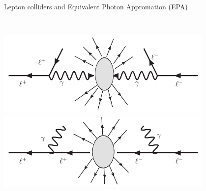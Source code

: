 \documentclass[aspectratio=169]{beamer}
\begin{document}
\begin{frame}{Lepton colliders and Equivalent Photon Appromation (EPA)}
\begin{columns}
\begin{column}{0.38\textwidth}
\begin{center}
				\end{center}
				\vspace{-8mm}
				\\ 
				\includegraphics[width=0.8\textwidth]{figs/EPA_collision2.pdf}
				\includegraphics[width=0.8\textwidth]{figs/ISR_collision2.pdf}
			\end{column}
			\end{columns}
\end{frame}
\end{document}
